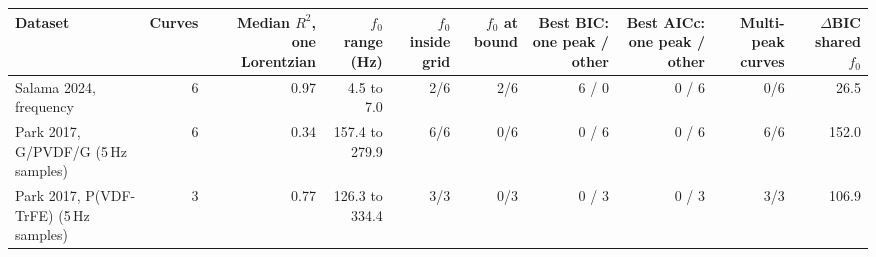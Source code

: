 \begin{tabular}{l r r r r r r r r r}
\toprule
Dataset & Curves & Median $R^2$, one Lorentzian & $f_0$ range (Hz) & $f_0$ inside grid & $f_0$ at bound & Best BIC: one peak / other & Best AICc: one peak / other & Multi-peak curves & $\Delta$BIC shared $f_0$ \\
\midrule
Salama 2024, frequency & 6 & 0.97 & 4.5 to 7.0 & 2/6 & 2/6 & 6 / 0 & 0 / 6 & 0/6 & 26.5 \\
Park 2017, G/PVDF/G (5\,Hz samples) & 6 & 0.34 & 157.4 to 279.9 & 6/6 & 0/6 & 0 / 6 & 0 / 6 & 6/6 & 152.0 \\
Park 2017, P(VDF-TrFE) (5\,Hz samples) & 3 & 0.77 & 126.3 to 334.4 & 3/3 & 0/3 & 0 / 3 & 0 / 3 & 3/3 & 106.9 \\
\bottomrule
\end{tabular}
